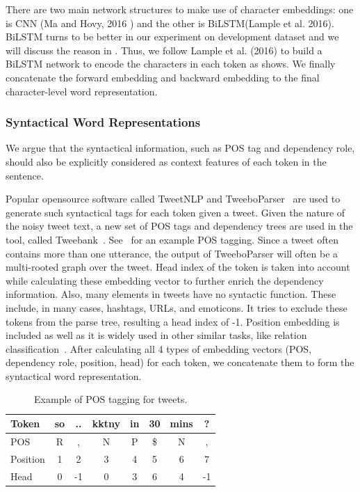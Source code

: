 There are two main network structures to make use of character embeddings: 
one is CNN (Ma and Hovy, 2016 \cite{} ) and the other is BiLSTM(Lample et al. 2016).
BiLSTM turns to be better in our experiment on development dataset and we will discuss the reason in .
Thus, we follow Lample et al. (2016) to build a BiLSTM network to encode the characters in each token as  shows.
We finally concatenate the forward embedding and backward embedding to the final character-level word representation.

\subsubsection{Syntactical Word Representations}
We argue that the syntactical information, such as POS tag and dependency role, should also be explicitly considered as context features of each token in the sentence. 

Popular opensource software called TweetNLP and TweeboParser~\cite{owoputi2013improved,kong2014dependency} are used to generate such syntactical tags for each token given a tweet.
Given the nature of the noisy tweet text, a new set of POS tags and dependency trees are used in the tool, called Tweebank~\cite{gimpel2011part}. See~ for an example POS tagging. Since a tweet often contains more than one utterance, the output of TweeboParser will often be a multi-rooted graph over the tweet.  Head index of the token is taken into account while calculating these embedding vector to further enrich the dependency information. Also, many elements in tweets have no syntactic function. These include, in many cases, hashtags, URLs, and emoticons. It tries to exclude these tokens from the parse tree, resulting a head index of -1.
Position embedding is included as well as it is widely used in other similar tasks, like relation classification~\cite{xu2016improved}.
After calculating all 4 types of embedding vectors (POS, dependency role, position, head) for each token, we concatenate them to form the syntactical word representation.
\begin{table}[]
	\centering
	\caption{Example of POS tagging for tweets.}
	\label{tbl:pos}
	\begin{tabular}{l|c|c|c|c|c|c|c}
		\hline
		Token & so & .. & kktny & in & 30 & mins & ? \\ \hline
		POS   & R  & ,  & N     & P  & \$  & N    & , \\ \hline
		Position & 1&2&3&4&5&6&7\\ \hline
		Head & 0 &-1& 0& 3& 6& 4& -1 \\ \hline
\end{tabular}
\end{table}


